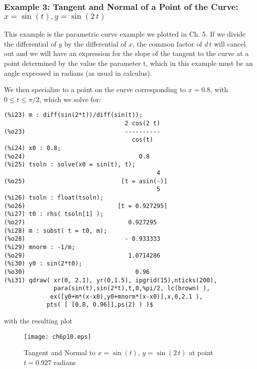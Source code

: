 \documentclass[12pt]{article}
\begin{document}
%  

\subsubsection{Example 3: Tangent and Normal of a Point of the Curve: $x = \sin(t), y = \sin(2\,t)$ }
This example is the parametric curve example we plotted in Ch. 5.
If we divide the differential of $y$ by the differential of $x$,
  the common factor of $d\,t$ will cancel out and we will have
  an expression for the slope of the tangent to the curve at a
   point determined by the value the parameter t, which in this
  example must be an angle expressed in radians (as usual in
  calculus).
  
\smallskip
We then specialize to a point on the curve corresponding to
  $x = 0.8$, with $0 \leq t \leq \pi/2$, which we solve for:  
\small
\begin{verbatim}
(%i23) m : diff(sin(2*t))/diff(sin(t));
                                  2 cos(2 t)
(%o23)                            ----------
                                    cos(t)
(%i24) x0 : 0.8;
(%o24)                                0.8
(%i25) tsoln : solve(x0 = sin(t), t);
                                           4
(%o25)                           [t = asin(-)]
                                           5
(%i26) tsoln : float(tsoln);
(%o26)                          [t = 0.927295]
(%i27) t0 : rhs( tsoln[1] );
(%o27)                             0.927295
(%i28) m : subst( t = t0, m);
(%o28)                            - 0.933333
(%i29) mnorm : -1/m;
(%o29)                             1.0714286
(%i30) y0 : sin(2*t0);
(%o30)                               0.96
(%i31) qdraw( xr(0, 2.1), yr(0,1.5), ipgrid(15),nticks(200),
              para(sin(t),sin(2*t),t,0,%pi/2, lc(brown) ),                 
             ex([y0+m*(x-x0),y0+mnorm*(x-x0)],x,0,2.1 ),
            pts( [ [0.8, 0.96]],ps(2) ) )$
\end{verbatim}
\normalsize
%
with the resulting plot
\begin{figure} [h]
   \centerline{\texttt{[image: ch6p10.eps]} }
	\caption{ Tangent and Normal to $x=\sin(t),\,y=\sin(2\,t)$ at point $t=0.927$ radians  }
\end{figure} 
\end{document}
